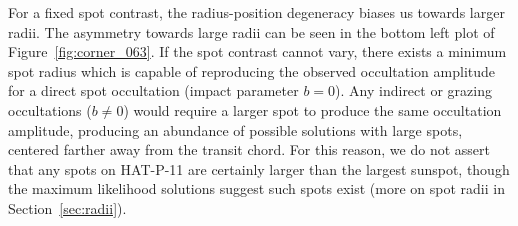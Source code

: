 For a fixed spot contrast, the radius-position degeneracy biases us towards larger radii. The asymmetry towards large radii can be seen in the bottom left plot of Figure~\ref{fig:corner_063}. If the spot contrast cannot vary, there exists a minimum spot radius which is capable of reproducing the observed occultation amplitude for a direct spot occultation (impact parameter $b=0$). Any indirect or grazing occultations ($b \neq 0$) would require a larger spot to produce the same occultation amplitude, producing an abundance of possible solutions with large spots, centered farther away from the transit chord. For this reason, we do not assert that any spots on HAT-P-11 are certainly larger than the largest sunspot, though the maximum likelihood solutions suggest such spots exist (more on spot radii in Section~\ref{sec:radii}).

